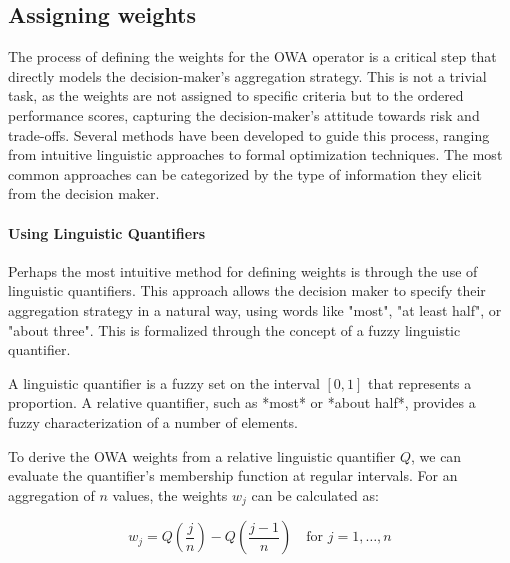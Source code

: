 \subsection{Assigning weights}



The process of defining the weights for the OWA operator is a critical step that directly models the decision-maker's aggregation strategy. This is not a trivial task, as the weights are not assigned to specific criteria but to the ordered performance scores, capturing the decision-maker's attitude towards risk and trade-offs. Several methods have been developed to guide this process, ranging from intuitive linguistic approaches to formal optimization techniques. The most common approaches can be categorized by the type of information they elicit from the decision maker.

\paragraph{Using Linguistic Quantifiers}
Perhaps the most intuitive method for defining weights is through the use of linguistic quantifiers. This approach allows the decision maker to specify their aggregation strategy in a natural way, using words like "most", "at least half", or "about three". This is formalized through the concept of a fuzzy linguistic quantifier.

\begin{definition} 
A linguistic quantifier is a fuzzy set on the interval $[0, 1]$ that represents a proportion. A relative quantifier, such as *most* or *about half*, provides a fuzzy characterization of a number of elements.
\end{definition}

To derive the OWA weights from a relative linguistic quantifier $Q$, we can evaluate the quantifier's membership function at regular intervals. For an aggregation of $n$ values, the weights $w_j$ can be calculated as:

\begin{equation}
    w_j = Q\left(\frac{j}{n}\right) - Q\left(\frac{j-1}{n}\right) \quad \text{for } j=1, \dots, n
\end{equation}

